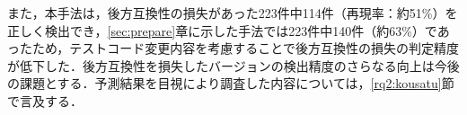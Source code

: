 \documentclass[submit]{ipsj}
\begin{document}
{また，本手法は，後方互換性の損失があった223件中114件（再現率：約51\%）を正しく検出でき，\ref{sec:prepare}章に示した手法では223件中140件（約63\%）であったため，テストコード変更内容を考慮することで後方互換性の損失の判定精度が低下した．後方互換性を損失したバージョンの検出精度のさらなる向上は今後の課題とする．予測結果を目視により調査した内容については，\ref{rq2:kousatu}節で言及する．









}
\end{document}
